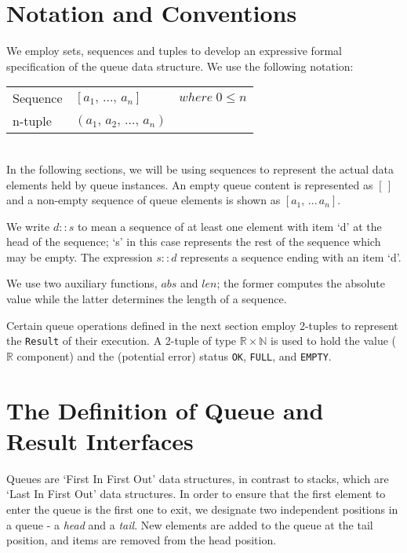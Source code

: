 \documentclass[10pt]{article}
\begin{document}
\section{Notation and Conventions}
We employ sets, sequences and tuples to develop an expressive formal specification of the queue data structure. We use the following notation:\vspace*{6pt}\\
\noindent\hspace*{32pt}\begin{tabular}{lll}
  Sequence & $[a_1, \, ..., \, a_n]$ & $where \; 0 \leq n$\vspace*{2pt}\\
  n-tuple & $(a_1, \, a_2, \, ...,\, a_n)$\\
\end{tabular}\vspace*{4pt}\\

In the following sections, we will be using sequences to represent the actual data elements held by queue instances. An empty queue content is represented as $[\,]$ and a non-empty sequence of queue elements is shown as $[a_1, \,...\, a_n].$ 

We write $d::s$ to mean a sequence of at least one element with item `d' at the head of the sequence; `s' in this case represents the rest of the sequence which may be empty. The expression $s::d$ represents a sequence ending with an item `d'.

We use two auxiliary functions, $abs$ and $len$; the former computes the absolute value while the latter determines the length of a sequence. 

 Certain queue operations defined in the next section employ 2-tuples to represent the \texttt{Result} of their execution. A 2-tuple of type $\mathbb{R} \times \mathbb{N}$ is used to hold the value ($\mathbb{R}$ component) and the (potential error) status \texttt{OK}, \texttt{FULL}, and \texttt{EMPTY}. 

\section{The Definition of Queue and Result Interfaces}
  \noindent Queues are `First In First Out' data structures, in contrast to stacks, which are `Last In First Out' data structures. In order to ensure that the first element to enter the queue is the first one to exit, we designate two independent positions in a queue - a \emph{head} and a \emph{tail}. New elements are added to the queue at the tail position, and items are removed from the head position.
\end{document}
